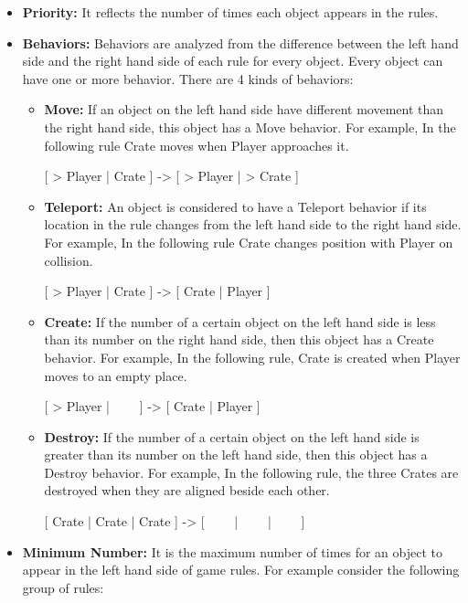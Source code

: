 \begin{itemize}
	\item \textbf{Priority:} It reflects the number of times each object appears in the rules.
	\item \textbf{Behaviors:} Behaviors are analyzed from the difference between the left hand side and the right hand side of each rule for every object. Every object can have one or more behavior. There are 4 kinds of behaviors:
		\begin{itemize} \itemsep0pt \parskip0pt 
			\item \textbf{Move:} If an object on the left hand side have different movement than the right hand side, this object has a Move behavior. For example, In the following rule Crate moves when Player approaches it.
			\begin{center}
				[ > Player | Crate ] -> [ > Player | > Crate ]
			\end{center}
			\item \textbf{Teleport:} An object is considered to have a Teleport behavior if its location in the rule changes from the left hand side to the right hand side. For example, In the following rule Crate changes position with Player on collision.
			\begin{center}
				[ > Player | Crate ] -> [ Crate | Player ]
			\end{center}
			\item \textbf{Create:} If the number of a certain object on the left hand side is less than its number on the right hand side, then this object has a Create behavior. For example, In the following rule, Crate is created when Player moves to an empty place.
			\begin{center}
				[ > Player | \ \ \ \ ] -> [ Crate | Player ]
			\end{center}
			\item \textbf{Destroy:} If the number of a certain object on the left hand side is greater than its number on the left hand side, then this object has a Destroy behavior. For example, In the following rule, the three Crates are destroyed when they are aligned beside each other.
			\begin{center}
				[ Crate | Crate | Crate ] -> [ \ \ \ \ | \ \ \ \ | \ \ \ \ ]
			\end{center}
		\end{itemize}
	\item \textbf{Minimum Number:} It is the maximum number of times for an object to appear in the left hand side of game rules. For example consider the following group of rules:

\end{itemize}
